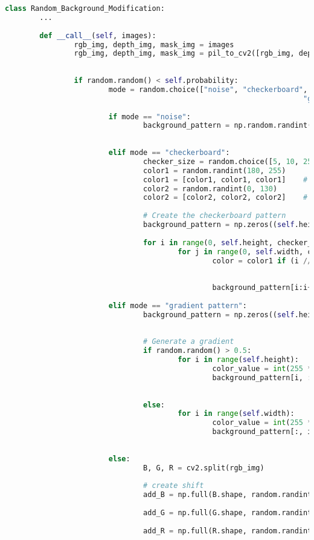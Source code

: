 		\begin{lstlisting}[language=Python,caption=Random Augmentation of the Background using cv2 in Python, label=lst:bg-augmentation]
class Random_Background_Modification:
		...
		
		def __call__(self, images):
				rgb_img, depth_img, mask_img = images
				rgb_img, depth_img, mask_img = pil_to_cv2([rgb_img, depth_img, 
																																		mask_img])
				
				if random.random() < self.probability:
						mode = random.choice(["noise", "checkerboard",     
											  						 "gradient pattern", "color shift"])
						
						if mode == "noise":
								background_pattern = np.random.randint(0, 256, 
																								(self.height, self.width, 3), 
																								dtype=np.uint8)
						elif mode == "checkerboard":
								checker_size = random.choice([5, 10, 25, 50])
								color1 = random.randint(180, 255)
								color1 = [color1, color1, color1]    # Brighter Color
								color2 = random.randint(0, 130)
								color2 = [color2, color2, color2]    # Darker Color
							
								# Create the checkerboard pattern
								background_pattern = np.zeros((self.height, self.width, 3)
																														, dtype=np.uint8)
								for i in range(0, self.height, checker_size):
										for j in range(0, self.width, checker_size):
												color = color1 if (i // checker_size + 
																							j // checker_size) 
																							% 2 == 0 else color2
												background_pattern[i:i+checker_size, 
																							j:j+checker_size] = color
						elif mode == "gradient pattern":
								background_pattern = np.zeros((self.height, self.width, 3)
																														, dtype=np.uint8)
							
								# Generate a gradient
								if random.random() > 0.5:
										for i in range(self.height):
												color_value = int(255 * (i / self.height))
												background_pattern[i, :] = [color_value, 
																												color_value, 
																												color_value]
								else:
										for i in range(self.width):
												color_value = int(255 * (i / self.width))
												background_pattern[:, i] = [color_value, 
																												color_value, 
																												color_value]
						else:
								B, G, R = cv2.split(rgb_img)
							
								# create shift
								add_B = np.full(B.shape, random.randint(10, 150), 
																												dtype=np.uint8)
								add_G = np.full(G.shape, random.randint(10, 150), 
																												dtype=np.uint8)
								add_R = np.full(R.shape, random.randint(10, 150), 
																												dtype=np.uint8)
								

\end{lstlisting}
